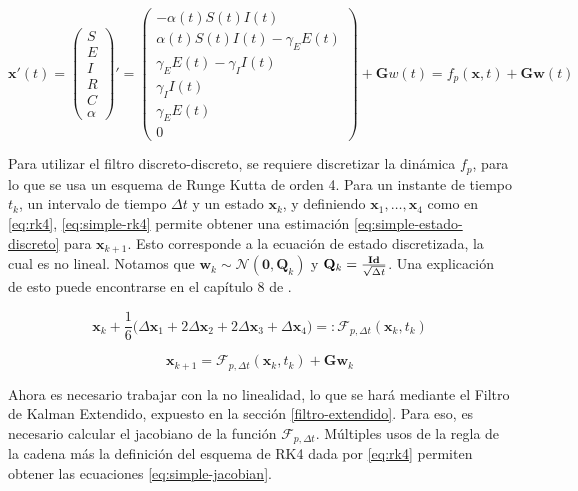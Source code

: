 \begin{equation} \label{eq:simple-estado}
\mathbf{x}'(t) =
\begin{pmatrix}
S \\
E\\
I\\
R\\
C\\
\alpha 
\end{pmatrix}' = 
\begin{pmatrix} 
-\alpha(t) S(t)I(t) \\
\alpha(t) S(t)I(t) - \gamma_E E(t) \\ 
\gamma_E E(t) - \gamma_{I} I(t)\\
\gamma_{I} I(t) \\
\gamma_E E(t) \\
0
\end{pmatrix} + \mathbf{G} w(t)= f_p(\mathbf{x}, t) + \mathbf{G} \mathbf{w}(t)
\end{equation}

Para utilizar el filtro discreto-discreto, se requiere discretizar la dinámica \(f_p\), para lo que se usa un esquema de Runge Kutta de orden 4. Para un instante de tiempo \(t_k\), un intervalo de tiempo \(\Delta t\) y un estado \(\mathbf{x}_k\), y definiendo \(\mathbf{x}_1, \dots, \mathbf{x}_4\) como en \ref{eq:rk4}, \ref{eq:simple-rk4} permite obtener una estimación \ref{eq:simple-estado-discreto} para \(\mathbf{x}_{k+1}\). Esto corresponde a la ecuación de estado discretizada, la cual es no lineal. Notamos que \(\mathbf{w}_{k} \sim \mathcal{N}(\mathbf{0}, \mathbf{Q}_k)\) y \(\mathbf{Q}_k = \frac{\text{\textbf{Id}}}{\sqrt{\Delta t}}\). Una explicación de esto puede encontrarse en el capítulo 8 de \cite{Simon2006}.

\begin{equation} \label{eq:simple-rk4}
\mathbf{x}_{k} + \frac{1}{6}\Big( \Delta \mathbf{x}_1  +  2\Delta \mathbf{x}_2 + 2\Delta \mathbf{x}_3 +\Delta \mathbf{x}_4\Big) =: \mathcal{F}_{p, \Delta t}(\mathbf{x}_k, t_k)
\end{equation}


\begin{equation} \label{eq:simple-estado-discreto}
\mathbf{x}_{k+1} = \mathcal{F}_{p, \Delta t}(\mathbf{x}_k, t_k) +  \mathbf{G}\mathbf{w}_{k} 
\end{equation}


Ahora es necesario trabajar con la no linealidad, lo que se hará mediante el Filtro de Kalman Extendido, expuesto en la sección \ref{filtro-extendido}. Para eso, es necesario calcular el jacobiano de la función \(\mathcal{F}_{p, \Delta t}\). Múltiples usos de la regla de la cadena más la definición del esquema de RK4 dada por \ref{eq:rk4} permiten obtener las ecuaciones \ref{eq:simple-jacobian}.

